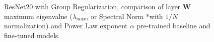 \begin{figure}[H]
   \centering
   \quad
   \caption{
     ResNet20 with Group Regularization, comparison of layer $\mathbf{W}$ maximum eigenvalue ($\lambda_{max}$, or Spectral Norm *with $1/N$ normalization) and 
     Power Law exponent $\alpha$ pre-trained baseline and fine-tuned models.
           }
   \label{fig:resnet204D5L}
\end{figure}

